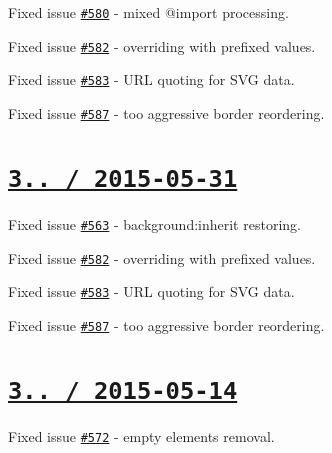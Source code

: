 \begin{DoxyItemize}
\item Fixed issue \href{https://github.com/jakubpawlowicz/clean-css/issues/580}{\tt \#580} -\/ mixed {\ttfamily @import} processing.
\item Fixed issue \href{https://github.com/jakubpawlowicz/clean-css/issues/582}{\tt \#582} -\/ overriding with prefixed values.
\item Fixed issue \href{https://github.com/jakubpawlowicz/clean-css/issues/583}{\tt \#583} -\/ U\+RL quoting for S\+VG data.
\item Fixed issue \href{https://github.com/jakubpawlowicz/clean-css/issues/587}{\tt \#587} -\/ too aggressive {\ttfamily border} reordering.
\end{DoxyItemize}

\section*{\href{https://github.com/jakubpawlowicz/clean-css/compare/v3.2.10...v3.2.11}{\tt 3.. / 2015-\/05-\/31} }


\begin{DoxyItemize}
\item Fixed issue \href{https://github.com/jakubpawlowicz/clean-css/issues/563}{\tt \#563} -\/ {\ttfamily background\+:inherit} restoring.
\item Fixed issue \href{https://github.com/jakubpawlowicz/clean-css/issues/582}{\tt \#582} -\/ overriding with prefixed values.
\item Fixed issue \href{https://github.com/jakubpawlowicz/clean-css/issues/583}{\tt \#583} -\/ U\+RL quoting for S\+VG data.
\item Fixed issue \href{https://github.com/jakubpawlowicz/clean-css/issues/587}{\tt \#587} -\/ too aggressive {\ttfamily border} reordering.
\end{DoxyItemize}

\section*{\href{https://github.com/jakubpawlowicz/clean-css/compare/v3.2.9...v3.2.10}{\tt 3.. / 2015-\/05-\/14} }


\begin{DoxyItemize}
\item Fixed issue \href{https://github.com/jakubpawlowicz/clean-css/issues/572}{\tt \#572} -\/ empty elements removal.
\end{DoxyItemize}

